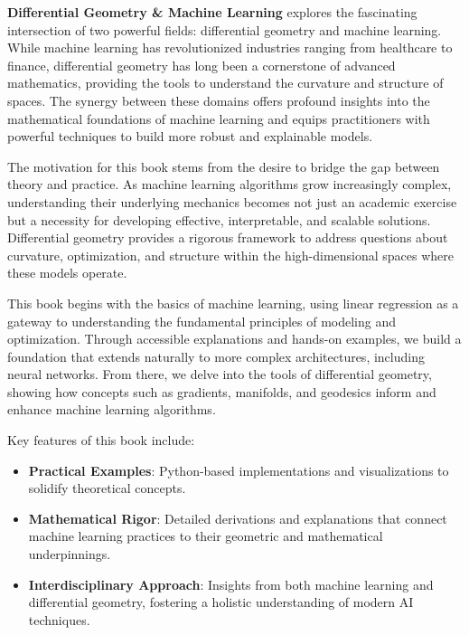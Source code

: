 %
%

\preface

\textbf{Differential Geometry \& Machine Learning} explores the fascinating intersection of two powerful fields: differential geometry and machine learning. While machine learning has revolutionized industries ranging from healthcare to finance, differential geometry has long been a cornerstone of advanced mathematics, providing the tools to understand the curvature and structure of spaces. The synergy between these domains offers profound insights into the mathematical foundations of machine learning and equips practitioners with powerful techniques to build more robust and explainable models.

The motivation for this book stems from the desire to bridge the gap between theory and practice. As machine learning algorithms grow increasingly complex, understanding their underlying mechanics becomes not just an academic exercise but a necessity for developing effective, interpretable, and scalable solutions. Differential geometry provides a rigorous framework to address questions about curvature, optimization, and structure within the high-dimensional spaces where these models operate.

This book begins with the basics of machine learning, using linear regression as a gateway to understanding the fundamental principles of modeling and optimization. Through accessible explanations and hands-on examples, we build a foundation that extends naturally to more complex architectures, including neural networks. From there, we delve into the tools of differential geometry, showing how concepts such as gradients, manifolds, and geodesics inform and enhance machine learning algorithms.

Key features of this book include:
\begin{itemize}
    \item \textbf{Practical Examples}: Python-based implementations and visualizations to solidify theoretical concepts.
    \item \textbf{Mathematical Rigor}: Detailed derivations and explanations that connect machine learning practices to their geometric and mathematical underpinnings.
    \item \textbf{Interdisciplinary Approach}: Insights from both machine learning and differential geometry, fostering a holistic understanding of modern AI techniques.
\end{itemize}


